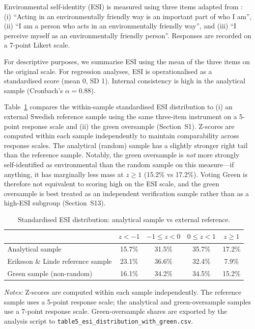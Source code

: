 \documentclass[12pt]{article}
\begin{document}
Environmental self-identity (ESI) is measured using three items adapted from \citet{VanDerWerff2013}: (i) ``Acting in an environmentally friendly way is an important part of who I am'', (ii) ``I am a person who acts in an environmentally friendly way'', and (iii) ``I perceive myself as an environmentally friendly person''. Responses are recorded on a 7-point Likert scale.

For descriptive purposes, we summarise ESI using the mean of the three items on the original scale. For regression analyses, ESI is operationalised as a standardised score (mean 0, SD 1). Internal consistency is high in the analytical sample (Cronbach's $\alpha = 0.88$).

Table~\ref{tab:esi_benchmark} compares the within-sample standardised ESI distribution to (i) an external Swedish reference sample using the same three-item instrument on a 5-point response scale \citep{eriksson2024integrating} and (ii) the green oversample (Section~S1). Z-scores are computed within each sample independently to maintain comparability across response scales. The analytical (random) sample has a slightly stronger right tail than the reference sample. Notably, the green oversample is \emph{not} more strongly self-identified as environmental than the random sample on this measure---if anything, it has marginally less mass at $z\geq 1$ (15.2\% vs 17.2\%). Voting Green is therefore not equivalent to scoring high on the ESI scale, and the green oversample is best treated as an independent verification sample rather than as a high-ESI subgroup (Section~S13).

\begin{table}[!htbp]
\centering
\small
\caption{Standardised ESI distribution: analytical sample vs external reference.}
\label{tab:esi_benchmark}
\begin{tabular}{lcccc}
\toprule
 & \textbf{$z<-1$} & \textbf{$-1 \le z < 0$} & \textbf{$0 \le z < 1$} & \textbf{$z \ge 1$} \\
\midrule
Analytical sample & 15.7\% & 31.5\% & 35.7\% & 17.2\% \\
Eriksson \& Linde reference sample & 23.1\% & 36.6\% & 32.4\% & 7.9\% \\
Green sample (non-random) & 16.1\% & 34.2\% & 34.5\% & 15.2\% \\
\bottomrule
\end{tabular}
\vspace{2mm}
\begin{flushleft}
\footnotesize
\textit{Notes:} Z-scores are computed within each sample independently. The reference sample uses a 5-point response scale; the analytical and green-oversample samples use a 7-point response scale. Green-oversample shares are exported by the analysis script to \texttt{table5\_esi\_distribution\_with\_green.csv}.
\end{flushleft}
\end{table}
\end{document}
